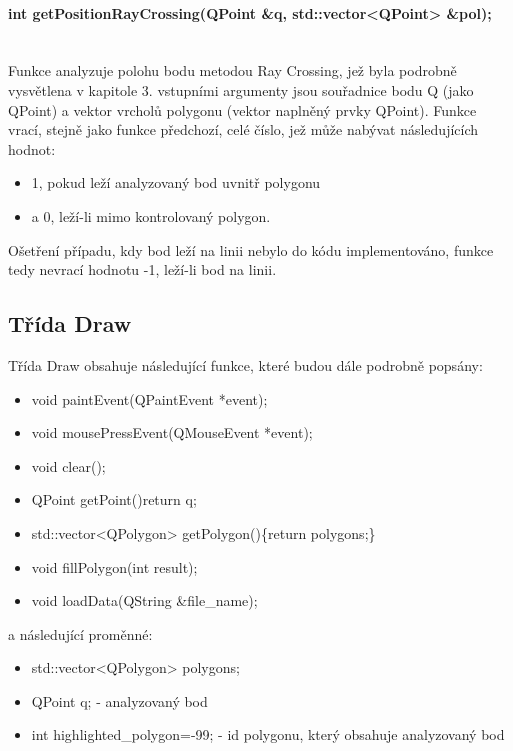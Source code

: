 \documentclass[11pt]{article}
\begin{document}
\paragraph{int getPositionRayCrossing(QPoint \&q, std::vector<QPoint> \&pol);}\mbox{}\\
Funkce analyzuje polohu bodu metodou Ray Crossing, jež byla podrobně vysvětlena v kapitole 3. vstupními argumenty jsou souřadnice bodu Q (jako QPoint) a vektor vrcholů polygonu (vektor naplněný prvky QPoint). Funkce vrací, stejně jako funkce předchozí, celé číslo, jež může nabývat následujících hodnot:

\begin{itemize}
\item 1, pokud leží analyzovaný bod uvnitř polygonu
\item a 0, leží-li mimo kontrolovaný polygon.
\end{itemize}

Ošetření případu, kdy bod leží na linii nebylo do kódu implementováno, funkce tedy nevrací  hodnotu -1, leží-li bod na linii.

\subsection{Třída Draw}
Třída Draw obsahuje následující funkce, které budou dále podrobně popsány:

\begin{itemize}
\item void paintEvent(QPaintEvent *event);
\item void mousePressEvent(QMouseEvent *event);
\item void clear();
\item QPoint getPoint(){return q;}
\item std::vector<QPolygon> getPolygon()\{return polygons;\}
\item void fillPolygon(int result);
\item void loadData(QString \&file\_name);
\end{itemize}

a následující proměnné:

\begin{itemize}
\item std::vector<QPolygon> polygons;  
\item QPoint q; - analyzovaný bod
\item int highlighted\_polygon=-99; - id polygonu, který obsahuje analyzovaný bod   
\end{itemize}
\end{document}
